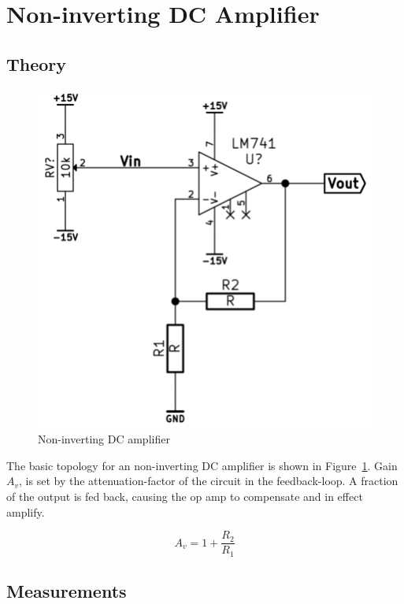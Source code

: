 \documentclass[11pt,a4paper]{article}
\begin{document}
\section{Non-inverting DC Amplifier}\label{non-inverting-dc-amplifier}

\subsection{Theory}\label{noninvDC-theory}

\begin{figure}[htbp]
    \centering
    \includegraphics[scale=0.5]{img/noninvDCamp.png}
    \caption{Non-inverting DC amplifier}
    \label{fig:noninvDCamp}
\end{figure}

The basic topology for an non-inverting DC amplifier is shown in Figure~\ref{fig:noninvDCamp}.
Gain $A_v$, is set by the attenuation-factor of the circuit in the feedback-loop. 
A fraction of the output is fed back, causing the op amp to compensate and in effect amplify.

\begin{equation}
    A_v = 1+\frac{R_2}{R_1}
\end{equation}


\subsection{Measurements}\label{measurements-2}
\end{document}
